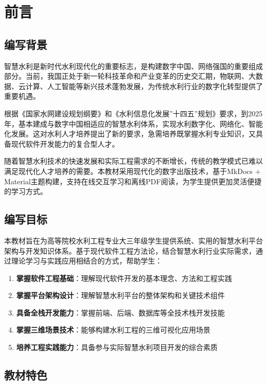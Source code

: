 \section{前言}\label{ux524dux8a00}

\subsection{编写背景}\label{ux7f16ux5199ux80ccux666f}

智慧水利是新时代水利现代化的重要标志，是构建数字中国、网络强国的重要组成部分。当前，我国正处于新一轮科技革命和产业变革的历史交汇期，物联网、大数据、云计算、人工智能等新兴技术蓬勃发展，为传统水利行业的数字化转型提供了重要机遇。

根据《国家水网建设规划纲要》和《水利信息化发展''十四五''规划》要求，到2025年，基本建成与数字中国相适应的智慧水利体系，实现水利数字化、网络化、智能化发展。这对水利人才培养提出了新的要求，急需培养既掌握水利专业知识，又具备现代软件开发能力的复合型人才。

随着智慧水利技术的快速发展和实际工程需求的不断增长，传统的教学模式已难以满足现代化人才培养的需要。本教材采用现代化的数字出版技术，基于MkDocs + Material主题构建，支持在线交互学习和离线PDF阅读，为学生提供更加灵活便捷的学习方式。

\subsection{编写目标}\label{ux7f16ux5199ux76eeux6807}

本教材旨在为高等院校水利工程专业大三年级学生提供系统、实用的智慧水利平台架构与开发知识体系。基于现代软件工程方法论，结合智慧水利行业实际需求，通过理论学习与实践应用相结合的方式，帮助学生：

\begin{enumerate}
\def\labelenumi{\arabic{enumi}.}
\tightlist
\item
  \textbf{掌握软件工程基础}：理解现代软件开发的基本理念、方法和工程实践
\item
  \textbf{掌握平台架构设计}：理解智慧水利平台的整体架构和关键技术组件
\item
  \textbf{具备全栈开发能力}：掌握前端、后端、数据库等全技术栈开发技能
\item
  \textbf{掌握三维场景技术}：能够构建水利工程的三维可视化应用场景
\item
  \textbf{培养工程实践能力}：具备参与实际智慧水利项目开发的综合素质
\end{enumerate}

\subsection{教材特色}\label{ux6559ux6750ux7279ux8272}


